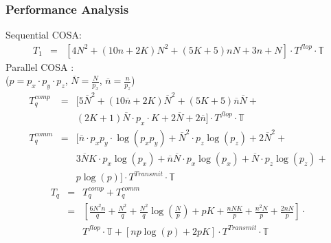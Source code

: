 \documentclass{beamer}
\begin{document}
\begin{frame}
\frametitle{Performance Analysis}
Sequential COSA:
\begin{eqnarray}
T_1&=&[4N^2+(10n+2K)N^2+(5K+5)nN+3n+N] \cdot T^{flop} \cdot \mathbb{T} \nonumber 
\end{eqnarray}
Parallel COSA :\\
($p=p_x \cdot p_y \cdot p_z$, $\overline{N}=\frac{N}{p_x}$, $\overline{n}=\frac{n}{p_z}$)
\begin{eqnarray}
T^{comp}_q&=& [5\overline{N}^2+(10\overline{n}+2K)\overline{N}^2+(5K+5)\overline{n}\overline{N}+\nonumber \\ &&(2K+1)\overline{N}\cdot p_x \cdot K+2\overline{N}+2\overline{n}] \cdot T^{flop} \cdot \mathbb{T}\nonumber \\
T^{comm}_q&=& [\overline{n}\cdot p_x p_y \cdot \log(p_xp_y)+\overline{N}^2\cdot p_z \log(p_z)+2\overline{N}^2+\nonumber \\ &&3\overline{N}K\cdot p_x \log(p_x)+\overline{n}\overline{N}\cdot p_x\log(p_x)+\overline{N}\cdot p_z \log(p_z)+\nonumber \\ &&p\log(p)] \cdot T^{Transmit} \cdot \mathbb{T}\nonumber
\end{eqnarray}
\begin{eqnarray}
T_q&=&T^{comp}_q+T^{comm}_q \nonumber \\
&=&[\frac{6N^2n}{q}+\frac{N^2}{q}+\frac{N^2}{q}\log(\frac{N}{p})+pK+\frac{nNK}{p}+\frac{n^2N}{p}+\frac{2nN}{p}] \cdot\nonumber \\
&& T^{flop} \cdot \mathbb{T}+[np\log(p)+2pK] \cdot T^{Transmit} \cdot \mathbb{T} \nonumber
\end{eqnarray}
\end{frame}
\end{document}
